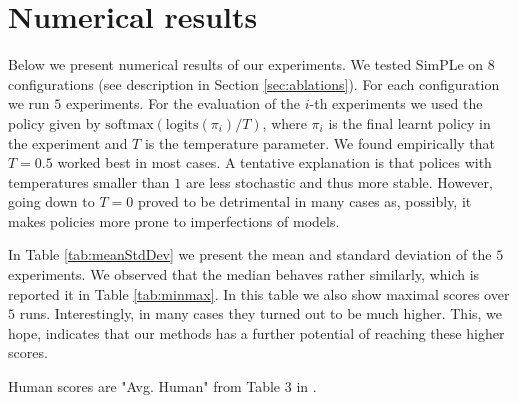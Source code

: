 \clearpage
\appendix

\onecolumn
\section{Numerical results}\label{numerical_results}
Below we present numerical results of our experiments. We tested SimPLe on $8$ configurations (see description in Section \ref{sec:ablations}). For each configuration we run $5$ experiments. For the evaluation of the $i$-th experiments we used the policy given by $\text{softmax}(\text{logits}(\pi_i)/T)$, where  $\pi_i$ is the final learnt policy in the experiment and $T$ is the temperature parameter. We found empirically that $T=0.5$ worked best in most cases. A tentative explanation is that polices with temperatures smaller than $1$ are less stochastic and thus more stable. However, going down to $T=0$ proved to be detrimental in many cases as, possibly, it makes policies more prone to imperfections of models.

In Table \ref{tab:meanStdDev} we present the mean and standard deviation of the $5$ experiments. We observed that the median behaves rather similarly, which is reported it in Table \ref{tab:minmax}. In this table we also show maximal scores over $5$ runs. Interestingly, in many cases they turned out to be much higher. This, we hope, indicates that our methods has a further potential of reaching these higher scores.

Human scores are "Avg. Human" from Table 3 in \cite{Pohlenetal2018}.

\newpage
\pagestyle{empty}
\newenvironment{changemargin}[2]{%
\begin{list}{}{%
\setlength{\topsep}{0pt}%
\setlength{\leftmargin}{#1}%
\setlength{\rightmargin}{#2}%
\setlength{\listparindent}{\parindent}%
\setlength{\itemindent}{\parindent}%
\setlength{\parsep}{\parskip}%
}%
\item[]}{\end{list}}

